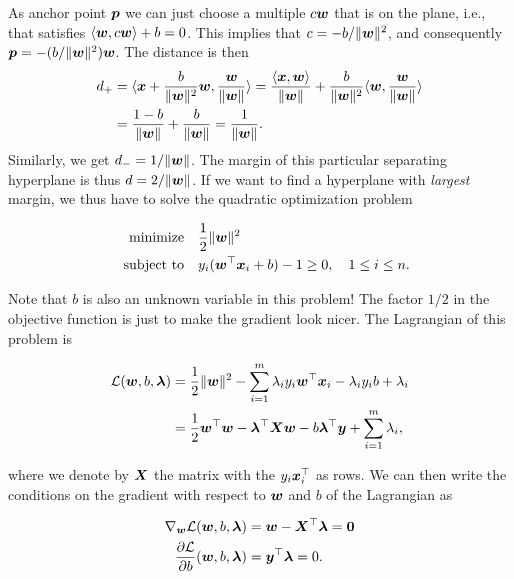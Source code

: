 As anchor point $\bm{p}$ we can just choose a multiple $c\bm{w}$ that is on the plane, i.e., that satisfies $\langle {\bm{w}}, {c\bm{w}} \rangle+b=0$. This implies that $c=-b/\Vert {\bm{w}}\Vert^2$, and consequently $\bm{p} = -(b/\Vert {\bm{w}}\Vert^2) \bm{w}$. The distance is then
\begin{align*}
  d_+ &= \langle {\bm{x}+\frac{b}{\Vert {\bm{w}}\Vert^2}\bm{w}}, {\frac{\bm{w}}{\Vert {\bm{w}}\Vert}} \rangle = \frac{\langle {\bm{x}}, {\bm{w}} \rangle}{\Vert {\bm{w}}\Vert}+\frac{b}{\Vert {\bm{w}}\Vert^2}\langle {\bm{w}}, {\frac{\bm{w}}{\Vert {\bm{w}}\Vert}} \rangle\\ 
  &= \frac{1-b}{\Vert {\bm{w}}\Vert}+\frac{b}{\Vert {\bm{w}}\Vert} = 
  \frac{1}{\Vert {\bm{w}}\Vert}.
\end{align*}
Similarly, we get $d_-=1/\Vert {\bm{w}}\Vert$. The margin of this particular separating hyperplane is thus $d=2/\Vert {\bm{w}}\Vert$. If we want to find a hyperplane with {\em largest} margin, we thus have to solve the quadratic optimization problem

\begin{align*}
\text{minimize}\quad & \frac{1}{2}\Vert {\bm{w}}\Vert^2\\
\quad\text{subject to}\quad & y_i(\bm{w}^{\top}\bm{x}_i+b)-1 \geq 0, \quad 1\leq i\leq n.
\end{align*}

Note that $b$ is also an unknown variable in this problem! 
The factor $1/2$ in the objective function is just to make the gradient look nicer. The Lagrangian of this problem is

\begin{align*}
\mathcal{L}(\bm{w},b,\bm{\lambda}) &= \frac{1}{2}\Vert {\bm{w}}\Vert^2 - \sum_{i=1}^m \lambda_i y_i \bm{w}^{\top}\bm{x}_i-\lambda_iy_ib+\lambda_i\\
&= \frac{1}{2}\bm{w}^{\top}\bm{w}-\bm{\lambda}^{\top}\bm{X}\bm{w}-b\bm{\lambda}^{\top}\bm{y}+\sum_{i=1}^m \lambda_i,
\end{align*}
 
where we denote by $\bm{X}$ the matrix with the $y_i\bm{x}_i^{\top}$ as rows. We can then write the conditions on the gradient with respect to $\bm{w}$ and $b$ of the Lagrangian as

\begin{align}\label{eq:lagrange-grad}
\begin{split}
 \nabla_{\bm{w}} \mathcal{L}(\bm{w},b,\bm{\lambda}) & = \bm{w}-\bm{X}^{\top}\bm{\lambda} = \bm{0} \\
 \frac{\partial \mathcal{L}}{\partial b}(\bm{w},b,\bm{\lambda}) &= \bm{y}^{\top}\bm{\lambda} = 0.
 \end{split}
\end{align}

